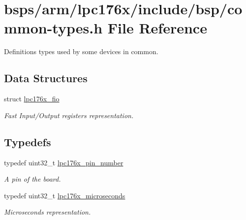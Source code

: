 \hypertarget{common-types_8h}{}\section{bsps/arm/lpc176x/include/bsp/common-\/types.h File Reference}
\label{common-types_8h}


Definitions types used by some devices in common.  


\subsection*{Data Structures}
\begin{DoxyCompactItemize}
\item 
struct \mbox{\hyperlink{structlpc176x__fio}{lpc176x\+\_\+fio}}
\begin{DoxyCompactList}\small\item\em Fast Input/\+Output registers representation. \end{DoxyCompactList}\end{DoxyCompactItemize}
\subsection*{Typedefs}
\begin{DoxyCompactItemize}
\item 
\mbox{\label{common-types_8h_a8215ced1557c43bc5925b691a3c1dc23}} 
typedef uint32\+\_\+t \mbox{\hyperlink{common-types_8h_a8215ced1557c43bc5925b691a3c1dc23}{lpc176x\+\_\+pin\+\_\+number}}
\begin{DoxyCompactList}\small\item\em A pin of the board. \end{DoxyCompactList}\item 
\mbox{\label{common-types_8h_a5ab79442aa5bb3d073777877fa865389}} 
typedef uint32\+\_\+t \mbox{\hyperlink{common-types_8h_a5ab79442aa5bb3d073777877fa865389}{lpc176x\+\_\+microseconds}}
\begin{DoxyCompactList}\small\item\em Microseconds representation. \end{DoxyCompactList}\end{DoxyCompactItemize}

